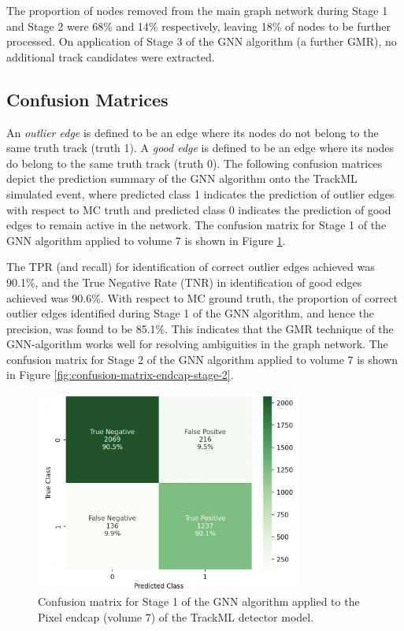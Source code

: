 The proportion of nodes removed from the main graph network during Stage 1 and Stage 2 were 68\% and 14\% respectively, leaving 18\% of nodes to be further processed. On application of Stage 3 of the GNN algorithm (a further GMR), no additional track candidates were extracted.


\subsection{Confusion Matrices}
\label{confusion-matrices-endcap-trackml}

An \textit{outlier edge} is defined to be an edge where its nodes do not belong to the same truth track (truth 1). A \textit{good edge} is defined to be an edge where its nodes do belong to the same truth track (truth 0). The following confusion matrices depict the prediction summary of the GNN algorithm onto the TrackML simulated event, where predicted class 1 indicates the prediction of outlier edges with respect to MC truth and predicted class 0 indicates the prediction of good edges to remain active in the network. The confusion matrix for Stage 1 of the GNN algorithm applied to volume 7 is shown in Figure \ref{fig:confusion-matrix-endcap-stage-1}.


The TPR (and recall) for identification of correct outlier edges achieved was 90.1\%, and the True Negative Rate (TNR) in identification of good edges achieved was 90.6\%. With respect to MC ground truth, the proportion of correct outlier edges identified during Stage 1 of the GNN algorithm, and hence the precision, was found to be 85.1\%. This indicates that the GMR technique of the GNN-algorithm works well for resolving ambiguities in the graph network. The confusion matrix for Stage 2 of the GNN algorithm applied to volume 7 is shown in Figure \ref{fig:confusion-matrix-endcap-stage-2}.

\begin{figure}[htbp]
    \centering
    \includegraphics[width=0.78\textwidth]{images/7-results/confusion_matrix_endcap_stage_1.png}
    \caption{Confusion matrix for Stage 1 of the GNN algorithm applied to the Pixel endcap (volume 7) of the TrackML detector model.}
    \label{fig:confusion-matrix-endcap-stage-1}%
\end{figure}
  

